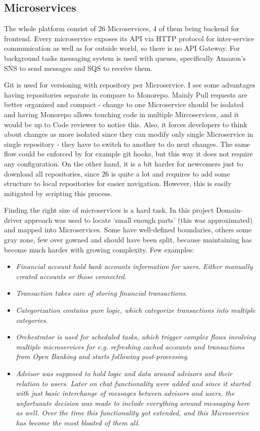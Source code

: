 \subsection{Microservices}
The whole platform consist of 26 Microservices, 4 of them being backend for frontend. Every microservice exposes its API via HTTP protocol for inter-service communication as well as for outside world, so there is no API Gateway. For background tasks messaging system is used with queues, specifically Amazon's SNS to send messages and SQS to receive them.

Git is used for versioning with repository per Microservice. I see some advantages having repositories separate in compare to Monorepo. Mainly Pull requests are better organized and compact - change to one Microservice should be isolated and having Monorepo allows touching code in multiple Mircoservices, and it would be up to Code reviewer to notice this. Also, it forces developers to think about changes as more isolated since they can modify only single Microservice in single repository - they have to switch to another to do next changes. The same flow could be enforced by for example git hooks, but this way it does not require any configuration. On the other hand, it is a bit harder for newcomers just to download all repositories, since 26 is quite a lot and requires to add some structure to local repositories for easier navigation. However, this is easily mitigated by scripting this process.

Finding the right size of microservices is a hard task. In this project Domain-driver approach was used to locate `small enough parts' (this was approximated) and mapped into Microservices. Some have well-defined boundaries, others some gray zone, few over gowned and should have been split, because maintaining has become much harder with growing complexity. Few examples:

\begin{itemize}
    \item \it{Financial account} hold bank accounts information for users. Either manually created accounts or those connected.
    \item \it{Transaction} takes care of storing financial transactions.
    \item \it{Categorization} contains pure logic, which categorize transactions into multiple categories.
    \item \it{Orchestrator} is used for scheduled tasks, which trigger complex flows involving multiple microservices for e.g. refreshing cached accounts and transactions from Open Banking and starts following post-processing.
    \item \it{Advisor} was supposed to hold logic and data around advisors and their relation to users. Later on chat functionality were added and since it started with just basic interchange of messages between advisors and users, the unfortunate decision was made to include everything around messaging here as well. Over the time this functionality got extended, and this Microservice has become the most bloated of them all.
\end{itemize}

